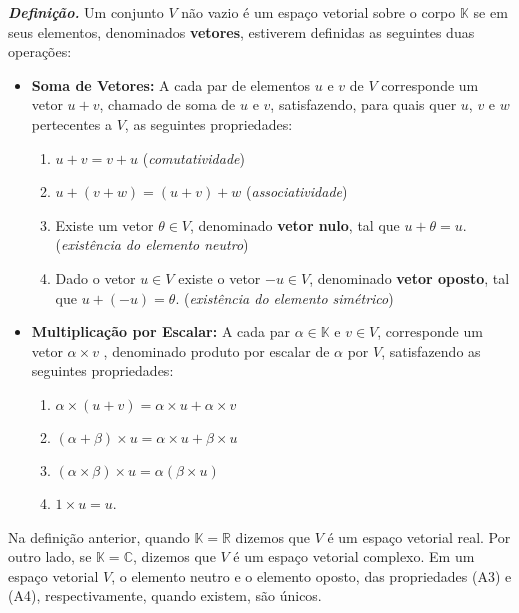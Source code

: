 \textit{\textbf{Definição.}} Um conjunto $ V$  não vazio é um espaço vetorial sobre o corpo $\mathbb{K}$  se  em seus elementos,  denominados \textbf{vetores}, estiverem definidas as seguintes duas operações:
\begin{itemize}
\item \textbf{Soma de Vetores:} A  cada par   de elementos $u$ e $v$ de $V$ corresponde um vetor  $u+v$, chamado de soma de  $u$ e $v$, satisfazendo,  para quais quer $u$, $v$ e $w$ pertecentes a $V$, as seguintes propriedades:

\begin{enumerate}[label=(\subscript{A}{\arabic*})]
    \item $u+v=v+u$  (\textit{comutatividade})
    \item $u+(v+w)=(u+v)+w$  (\textit{associatividade})
    \item Existe um vetor $\theta \in V$,  denominado \textbf{vetor nulo}, tal que $u+\theta = u$.  (\textit{existência  do elemento neutro})
   \item Dado o vetor $u\in V$ existe o vetor $-u \in V$, denominado \textbf{vetor oposto}, tal que $u+(-u)=\theta$. (\textit{existência  do elemento simétrico})
    \end{enumerate}

 \item \textbf{Multiplicação por Escalar:}   A cada par $\alpha \in \mathbb{K}$   e  $v \in V$, corresponde um vetor $\alpha \times v$ , denominado produto por escalar de $\alpha$  por   $V$,  satisfazendo as seguintes propriedades:

\begin{enumerate}[label=(\subscript{ME}{\arabic*})]
     \item $\alpha \times (u+v)=\alpha \times u+\alpha \times v$
     \item$(\alpha + \beta) \times u= \alpha \times u+\beta \times u$
    \item $(\alpha \times \beta) \times u= \alpha (\beta \times u)$
   \item $1 \times u=u$.
    \end{enumerate}
\end{itemize}

Na definição anterior, quando $\mathbb{K}= \mathbb{R}$  dizemos que $V$ é um espaço vetorial real. Por outro lado, se $\mathbb{K}= \mathbb{C}$,   dizemos que $V$ é um espaço vetorial  complexo. Em um espaço vetorial $V$, o elemento neutro e o elemento oposto, das propriedades (A3) e (A4), respectivamente,  quando existem, são únicos.

